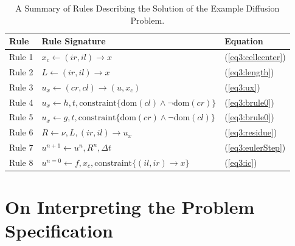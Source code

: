 \documentclass[10pt,epsf,letterpaper,twoside]{book}
\begin{document}
\begin{table}[htbp]
\caption{ A Summary of Rules Describing the Solution of the Example
    Diffusion Problem.}
\label{table3:rules}
\begin{center}
  \begin{tabular}{|l|l|l|}
    \hline
    Rule  & Rule Signature & Equation\\
    \hline
    Rule 1 & $x_c \leftarrow (ir,il)\rightarrow x $ &
    (\ref{eq3:cellcenter})\\
    Rule 2 & $ L \leftarrow (ir,il)\rightarrow x $ &
    (\ref{eq3:length})\\
    Rule 3 & $u_x \leftarrow (cr,cl)\rightarrow(u,x_c)$ &
    (\ref{eq3:ux})\\
    Rule 4 & $u_x \leftarrow  h, t, \mbox{constraint}\lbrace 
    \mathrm{dom}(cl) \wedge \neg \mathrm{dom}(cr) \rbrace$ &
    (\ref{eq3:brule0})\\
    Rule 5 & $u_x \leftarrow  g, t, \mbox{constraint}\lbrace 
    \mathrm{dom}(cr) \wedge \neg \mathrm{dom}(cl) \rbrace$ &
    (\ref{eq3:brule0})\\
    Rule 6 & $R\leftarrow \nu,L,(ir,il)\rightarrow u_x$ & (\ref{eq3:residue})\\
    Rule 7 & $u^{n+1} \leftarrow u^n, R^n, \Delta t$ & (\ref{eq3:eulerStep})\\
    Rule 8 & $u^{n=0} \leftarrow f,x_c,\mbox{constraint}\lbrace(il,ir)\rightarrow
    x\rbrace $ &
    (\ref{eq3:ic})\\
    \hline
  \end{tabular}
\end{center}
\end{table}

\section{On Interpreting the Problem Specification}
\end{document}
